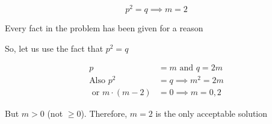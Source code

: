 \documentclass[14pt,fleqn]{extarticle}
\begin{document}
\begin{problem}
\begin{step}
  \begin{options} 
     \correct 
       
       \[ p^2 = q \implies m = 2 \]
        
    \end{options} 
     \reason 
       
     Every fact in the problem has been given for a reason\newline 
     
     So, let us use the fact that $p^2 = q$ 
     
     \begin{align}
	p &= m \text{ and } q = 2m \\
	\text{Also }p^2 &= q \implies m^2 = 2m \\
	\text{ or } m\cdot(m-2) &= 0\implies m = 0,2 
\end{align}

But $m > 0$ (not $\geq 0$). Therefore, $m=2$ is the only acceptable solution 
\end{step}
\end{problem} 
\end{document}

